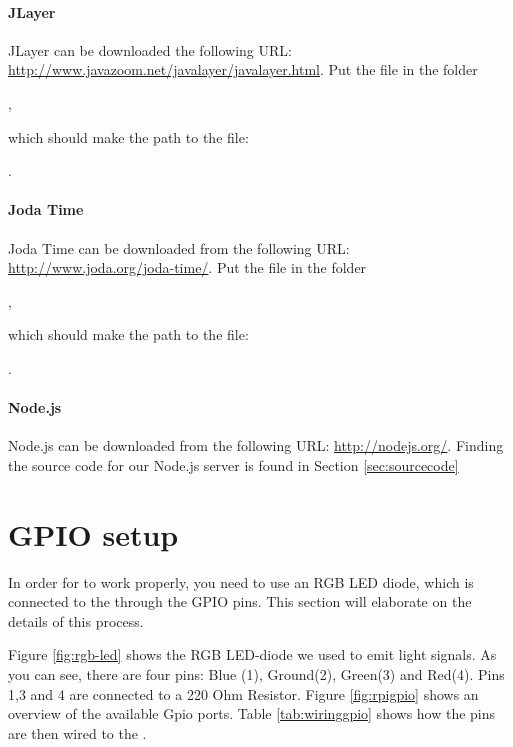 \paragraph{JLayer}
JLayer can be downloaded the following URL: \url{http://www.javazoom.net/javalayer/javalayer.html}. Put the file  in the folder 

, 

which should make the path to the file:

 .  

\paragraph{Joda Time}
Joda Time can be downloaded from the following URL: \url{http://www.joda.org/joda-time/}. Put the file  in the folder 

,

which should make the path to the file:

 . 

\paragraph{Node.js}
Node.js can be downloaded from the following URL: \url{http://nodejs.org/}. Finding the source code for our Node.js server is found in Section \ref{sec:sourcecode}

\section{GPIO setup}
In order for \ab{} to work properly, you need to use an RGB LED diode, which is connected to the \rpi{} through the GPIO pins. This section will elaborate on the details of this process. 

Figure \ref{fig:rgb-led} shows the RGB LED-diode we used to emit light signals. As you can see, there are four pins: Blue (1), Ground(2), Green(3) and Red(4). Pins 1,3 and 4 are connected to a 220 Ohm Resistor. Figure \ref{fig:rpigpio} shows an overview of the available Gpio ports.  Table \ref{tab:wiringgpio} shows how the pins are then wired to the \rpi{}. 

